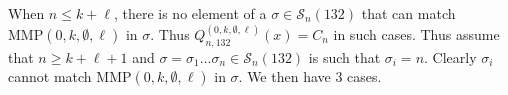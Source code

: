 \documentclass[
final,nomarks
]{dmtcs-episciences}
\newcommand{\Sn}[1]{\mathcal{S}_{#1}}
\newcommand{\Qmmn}[2]{Q_{#2,132}^{(#1)}(x)}
\newcommand{\MMP}{\mathrm{MMP}}
\begin{document}
When \begin{math}n \leq k+\ell\end{math}, there is no element of a \begin{math}\sigma \in \Sn{n}(132)\end{math} that 
can match \begin{math}\MMP(0,k,\emptyset,\ell)\end{math} in \begin{math}\sigma\end{math}. Thus \begin{math}\Qmmn{0,k,\emptyset,\ell}{n} = C_n\end{math} 
in such cases. Thus assume that \begin{math}n \geq k+\ell +1\end{math} and \begin{math}\sigma =\sigma_1 \ldots \sigma_n \in 
\Sn{n}(132)\end{math} is such that \begin{math}\sigma_i =n\end{math}. Clearly \begin{math}\sigma_i\end{math} cannot match 
\begin{math}\MMP(0,k,\emptyset,\ell)\end{math} in \begin{math}\sigma\end{math}. We then have 3 cases. 
\end{document}

